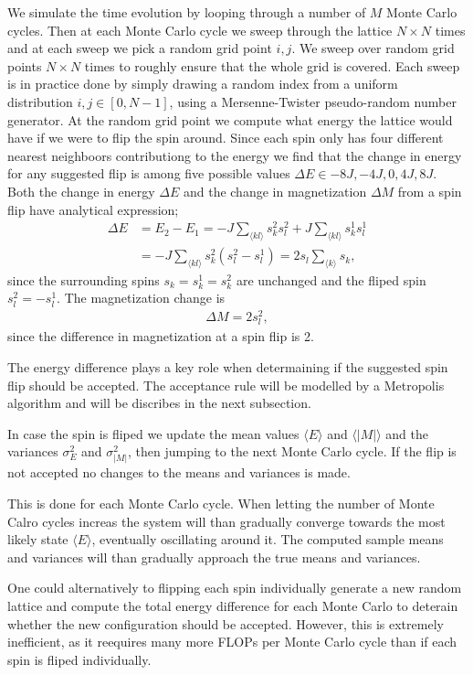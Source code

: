 \documentclass[twocolumn]{aastex62}
\begin{document}
We simulate the time evolution by looping through a number of $M$ Monte Carlo
cycles. Then at each Monte Carlo cycle we sweep through the lattice $N\times N$
times and at each sweep we pick a random grid point $i, j$. We sweep over random
grid points $N\times N$ times to roughly ensure that the whole grid is covered.
Each sweep is in practice done by
simply drawing a random index from a uniform distribution $i,j\in[0, N-1]$,
using a Mersenne-Twister pseudo-random number generator. At the random grid
point we compute what energy the lattice would have if we were to flip the spin
around. Since each spin only has four different nearest neighboors contributiong
to
the energy we find that the change in energy for any suggested flip is among
five possible values $\Delta E \in {-8J, -4J, 0, 4J, 8J}$. Both the change in
energy $\Delta E$ and the change in magnetization $\Delta M$ from a spin flip have analytical
expression;
\begin{align}
	\Delta E &= E_2 - E_1 = -J\sum_{\langle kl\rangle}s_k^2s_l^2 + J\sum_{\langle kl\rangle}s_k^1s_l^1 \\
	&= -J\sum_{\langle kl\rangle}s_k^2(s_l^2-s_l^1) = 2s_l\sum_{\langle k\rangle} s_k,
\end{align}
since the surrounding spins $s_k = s_k^1 = s_k^2$ are unchanged and the fliped
spin $s_l^2 = -s_l^1$. The magnetization change is 
\begin{align}
	\Delta M = 2s_l^2,
\end{align}
since the difference in magnetization at a spin flip is 2. 

The energy difference plays a key role when determaining if the suggested spin
flip should be accepted. The acceptance rule will be modelled by a Metropolis
algorithm and will be discribes in the next subsection. 

In case the spin is fliped we update the mean values $\langle E \rangle$ and
$\langle |M| \rangle$ and the variances $\sigma_E^2$ and $\sigma_{|M|}^2$, then
jumping to the next Monte Carlo cycle. If the flip is not accepted no changes to
the means and variances is made.

This is done for each Monte Carlo cycle. When letting the number of Monte Calro
cycles increas the system will than gradually converge towards the most likely
state $\langle E \rangle$, eventually oscillating around it. The computed sample
means and variances will than gradually approach the true means and variances.

One could alternatively to flipping each spin individually generate a new random
lattice and compute the total energy difference for each Monte Carlo to deterain whether
the new configuration should be accepted. However, this is extremely
inefficient, as it reequires many more FLOPs per Monte Carlo cycle than if each
spin is fliped individually.
\end{document}
